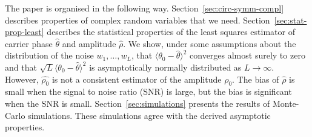 \documentclass[conference]{IEEEtran}
\begin{document}
The paper is organised in the following way.  Section~\ref{sec:circ-symm-compl} describes properties of complex random variables that we need.  Section~\ref{sec:stat-prop-least} describes the statistical properties of the least squares estimator of carrier phase $\hat{\theta}$ and amplitude $\hat{\rho}$.  We show, under some assumptions about the distribution of the noise $w_1,\dots,w_L$, that $\langle\theta_0 - \hat{\theta}\rangle^2$ converges almost surely to zero and that $\sqrt{L}\langle\theta_0 - \hat{\theta}\rangle^2$ is asymptotically normally distributed as $L\rightarrow \infty$.  However, $\hat{\rho_0}$ is not a consistent estimator of the amplitude $\rho_0$.  The bias of $\hat{\rho}$ is small when the signal to noise ratio (SNR) is large, but the bias is significant when the SNR is small.  %
Section~\ref{sec:simulations} presents the results of Monte-Carlo simulations.  These simulations agree with the derived asymptotic properties. 




\end{document}
